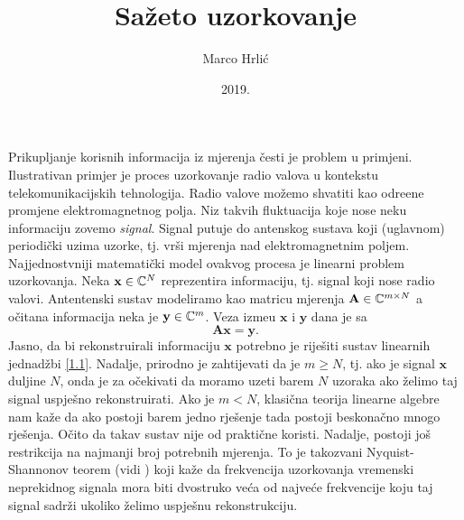 \documentclass[a4paper,twoside,12pt]{memoir} %
\title{Sa\v{z}eto uzorkovanje}
\author{Marco Hrli\'c}
\date{2019.}  %
\newcommand{\vect}[1]{\mathbf{#1}}
\renewcommand{\vec}{\vect}
\begin{document}
\setlength\abovedisplayskip{10pt}
\setlength\belowdisplayskip{10pt}
\setlength\abovedisplayshortskip{10pt}
\setlength\belowdisplayshortskip{10pt}

\nocite{*}

\frontmatter


\begin{intro}
    Prikupljanje korisnih informacija iz mjerenja \v{c}esti je problem u primjeni. Ilustrativan primjer je proces uzorkovanje radio valova u kontekstu telekomunikacijskih tehnologija. Radio valove mo\v{z}emo shvatiti kao odre\dj ene promjene elektromagnetnog polja. Niz takvih fluktuacija koje nose neku informaciju zovemo \textit{signal}. Signal putuje do antenskog sustava koji (uglavnom) periodi\v{c}ki uzima uzorke, tj. vr\v{s}i mjerenja nad elektromagnetnim poljem. Najjednostvniji matemati\v{c}ki model ovakvog procesa je linearni problem uzorkovanja. Neka $\vec x \in \C^N$ reprezentira informaciju, tj. signal koji nose radio valovi. Antentenski sustav modeliramo kao matricu mjerenja $\vec A \in \C^{m \times N}$ a o\v{c}itana informacija neka je $\vec y \in \C^m$. Veza izme\dj u $\vec x$ i $\vec y$ dana je sa
    \begin{equation}\label{1.1}
        \vec{Ax} = \vec{y}. 
    \end{equation}
    Jasno, da bi rekonstruirali informaciju $\vec x$ potrebno je rije\v{s}iti sustav linearnih jednad\v{z}bi \eqref{1.1}. Nadalje, prirodno je zahtijevati da je $m \geq N$, tj. ako je signal $\vec x$ duljine $N$, onda je za o\v{c}ekivati da moramo uzeti barem $N$ uzoraka ako \v{z}elimo taj signal uspje\v{s}no rekonstruirati. Ako je $m < N$, klasi\v{c}na teorija linearne algebre nam ka\v{z}e da ako postoji barem jedno rje\v{s}enje tada postoji beskona\v{c}no mnogo rje\v{s}enja. O\v{c}ito da takav sustav nije od prakti\v{c}ne koristi. Nadalje, postoji jo\v{s} restrikcija na najmanji broj potrebnih mjerenja. To je takozvani Nyquist-Shannonov teorem (vidi \cite{shannon1949}) koji ka\v{z}e da frekvencija uzorkovanja vremenski neprekidnog signala mora biti dvostruko ve\'ca od najve\'ce frekvencije koju taj signal sadr\v{z}i ukoliko \v{z}elimo uspje\v{s}nu rekonstrukciju. \\
    \indent

\end{intro}
\end{document}
